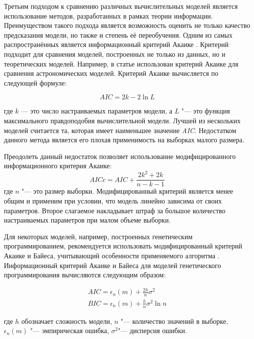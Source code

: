 Третьим подходом к сравнению различных вычислительных моделей является использование методов, разработанных в рамках 
теории информации. Преимуществом такого подхода является возможность оценить не только качество предсказания модели, 
но также и степень её переобучения. Одним из самых распространённых является информационный критерий Акаике 
\cite{akaike1974new}. Критерий подходит для сравнения моделей, построенных не только из данных, но и теоретических 
моделей. Например, в статье \cite{liddle2007information} использован критерий Акаике для сравнения астрономических 
моделей. Критерий Акаике вычисляется по следующей формуле:

\begin{equation}
AIC=2k-2\ln L
\end{equation}

где $k$ — это число настраиваемых параметров модели, а $L$ "--- это функция максимального правдоподобия вычислительной 
модели. Лучшей из нескольких моделей считается та, которая имеет наименьшее значение \textit{AIC}. Недостатком данного 
метода является его плохая применимость на выборках малого размера. 

Преодолеть данный недостаток позволяет использование модифицированного информационного критерия Акаике:  
\begin{equation}
AICc = AIC + \frac{2k^2+2k}{n-k-1}
\end{equation}
где $n$ "--- это размер выборки. Модифицированный критерий является менее общим и применим при условии, что модель 
линейно зависима от своих параметров. Второе слагаемое накладывает штраф за большое количество настраиваемых параметров 
при малом объеме выборки. 

Для некоторых моделей, например, построенных генетическим программированием, рекомендуется использовать 
модифицированный критерий Акаике и Байеса, учитывающий особенности применяемого алгоритма 
\cite{giraud2021introduction}.  Информационный критерий Акаике и Байеса для моделей генетического программирования 
вычисляются следующим образом:

\begin{equation}
  \begin{array}{l}
AIC=\epsilon_n (m) + \frac{2h}{n} \sigma^2  \\
BIC=\epsilon_n (m) + \frac{h}{n} \sigma^2 \ln n  
  \end{array}
\end{equation}

где $h$ обозначает сложность модели, $n$ "--- количество значений в выборке, $\epsilon_n (m)$ "--- эмпирическая ошибка, 
$\sigma^2$"--- дисперсия ошибки.

